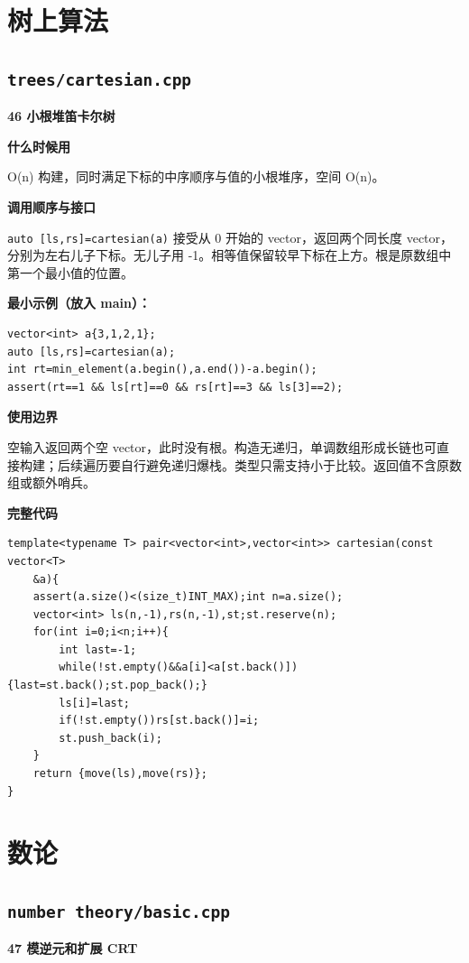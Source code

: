 \documentclass[UTF8,a4paper,10pt]{ctexart}
\newcommand{\TemplUsage}[1]{\textbf{什么时候用}\par #1\par}
\newcommand{\TemplApi}[1]{\textbf{调用顺序与接口}\par #1\par}
\newcommand{\TemplNote}[1]{\textbf{使用边界}\par #1\par}
\begin{document}
\section{树上算法}
\subsection{\texttt{trees/cartesian.cpp}}
\textbf{46 小根堆笛卡尔树}

\TemplUsage{O(n) 构建，同时满足下标的中序顺序与值的小根堆序，空间 O(n)。}
\TemplApi{\texttt{auto [ls,rs]=cartesian(a)} 接受从 0 开始的 vector，返回两个同长度 vector，分别为左右儿子下标。无儿子用 -1。相等值保留较早下标在上方。根是原数组中第一个最小值的位置。}
\textbf{最小示例（放入 main）：}
\begin{lstlisting}
vector<int> a{3,1,2,1};
auto [ls,rs]=cartesian(a);
int rt=min_element(a.begin(),a.end())-a.begin();
assert(rt==1 && ls[rt]==0 && rs[rt]==3 && ls[3]==2);
\end{lstlisting}
\TemplNote{空输入返回两个空 vector，此时没有根。构造无递归，单调数组形成长链也可直接构建；后续遍历要自行避免递归爆栈。类型只需支持小于比较。返回值不含原数组或额外哨兵。}
\textbf{完整代码}
\begin{lstlisting}[firstnumber=1]
template<typename T> pair<vector<int>,vector<int>> cartesian(const vector<T>
	&a){
	assert(a.size()<(size_t)INT_MAX);int n=a.size();
	vector<int> ls(n,-1),rs(n,-1),st;st.reserve(n);
	for(int i=0;i<n;i++){
		int last=-1;
		while(!st.empty()&&a[i]<a[st.back()]){last=st.back();st.pop_back();}
		ls[i]=last;
		if(!st.empty())rs[st.back()]=i;
		st.push_back(i);
	}
	return {move(ls),move(rs)};
}
\end{lstlisting}
\par\vspace{1em}
\clearpage
\section{数论}
\subsection{\texttt{number theory/basic.cpp}}
\textbf{47 模逆元和扩展 CRT}
\end{document}

